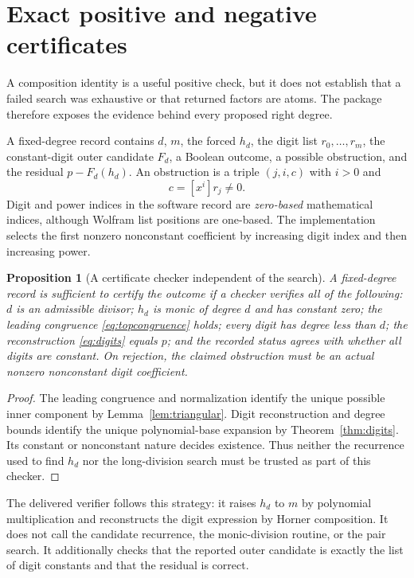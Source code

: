 \documentclass[11pt,a4paper]{article}
\numberwithin{equation}{section}
\newtheorem{proposition}[theorem]{Proposition}
\theoremstyle{definition}
\theoremstyle{remark}
\begin{document}
\section{Exact positive and negative certificates}
\label{sec:certificates}
A composition identity is a useful positive check, but it does not establish
that a failed search was exhaustive or that returned factors are atoms. The
package therefore exposes the evidence behind every proposed right degree.

A fixed-degree record contains $d$, $m$, the forced $h_d$, the digit list
$r_0,\ldots,r_m$, the constant-digit outer candidate $F_d$, a Boolean outcome,
a possible obstruction, and the residual $p-F_d(h_d)$. An obstruction is a
triple $(j,i,c)$ with $i>0$ and
\[
 c=[x^i]r_j\ne0.
\]
Digit and power indices in the software record are \emph{zero-based}
mathematical indices, although Wolfram list positions are one-based. The
implementation selects the first nonzero nonconstant coefficient by increasing
digit index and then increasing power.

\begin{proposition}[A certificate checker independent of the search]
\label{prop:checker}
A fixed-degree record is sufficient to certify the outcome if a checker
verifies all of the following: $d$ is an admissible divisor; $h_d$ is monic
of degree $d$ and has constant zero; the leading congruence
\eqref{eq:topcongruence} holds; every digit has degree less than $d$; the
reconstruction \eqref{eq:digits} equals $p$; and the recorded status agrees
with whether all digits are constant. On rejection, the claimed obstruction
must be an actual nonzero nonconstant digit coefficient.
\end{proposition}
\begin{proof}
The leading congruence and normalization identify the unique possible inner
component by Lemma~\ref{lem:triangular}. Digit reconstruction and degree bounds
identify the unique polynomial-base expansion by Theorem~\ref{thm:digits}.
Its constant or nonconstant nature decides existence. Thus neither the
recurrence used to find $h_d$ nor the long-division search must be trusted as
part of this checker.
\end{proof}

The delivered verifier follows this strategy: it raises $h_d$ to $m$ by
polynomial multiplication and reconstructs the digit expression by Horner
composition. It does not call the candidate recurrence, the monic-division
routine, or the pair search. It additionally checks that the reported outer
candidate is exactly the list of digit constants and that the residual is
correct.
\end{document}
